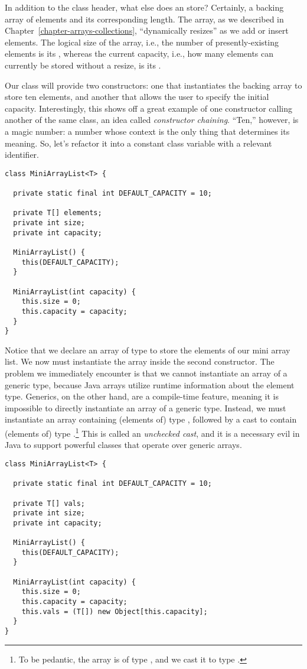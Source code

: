 In addition to the class header, what else does an  store? 
Certainly, a backing array of elements and its corresponding length. 
The array, as we described in Chapter~\ref{chapter-arrays-collections}, ``dynamically resizes'' as we add or insert elements. 
The logical size of the array, i.e., the number of presently-existing elements is its , whereas the current capacity, i.e., how many elements can currently be stored without a resize, is its . 

Our class will provide two constructors: one that instantiates the backing array to store ten elements, and another that allows the user to specify the initial capacity. 
Interestingly, this shows off a great example of one constructor calling another of the same class, an idea called \emph{constructor chaining}. 
``Ten,'' however, is a magic number: a number whose context is the only thing that determines its meaning. 
So, let's refactor it into a constant class variable with a relevant identifier.

\begin{lstlisting}[language=MyJava]
class MiniArrayList<T> {

  private static final int DEFAULT_CAPACITY = 10;

  private T[] elements;
  private int size;
  private int capacity;

  MiniArrayList() { 
    this(DEFAULT_CAPACITY); 
  }

  MiniArrayList(int capacity) {
    this.size = 0;
    this.capacity = capacity;
  }
}
\end{lstlisting}

Notice that we declare an array of type  to store the elements of our mini array list. 
We now must instantiate the array inside the second constructor. 
The problem we immediately encounter is that we cannot instantiate an array of a generic type, because Java arrays utilize runtime information about the element type. 
Generics, on the other hand, are a compile-time feature, meaning it is impossible to directly instantiate an array of a generic type. 
Instead, we must instantiate an array containing (elements of) type , followed by a cast to contain (elements of) type .\footnote{To be pedantic, the array is of type , and we cast it to type .} 
This is called an \emph{unchecked cast}, and it is a necessary evil in Java to support powerful classes that operate over generic arrays.

\enlargethispage{-1\baselineskip}
\begin{lstlisting}[language=MyJava]
class MiniArrayList<T> {

  private static final int DEFAULT_CAPACITY = 10;

  private T[] vals;
  private int size;
  private int capacity;

  MiniArrayList() { 
    this(DEFAULT_CAPACITY); 
  }

  MiniArrayList(int capacity) {
    this.size = 0;
    this.capacity = capacity;
    this.vals = (T[]) new Object[this.capacity];
  }
}
\end{lstlisting}

